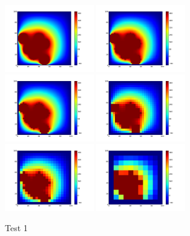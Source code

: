 \documentclass[a4paper]{article}
\begin{document}
\begin{figure}[htbp]
\includegraphics[width=110pt]{img/Parabrisas1-1.png} \includegraphics[width=110pt]{img/Parabrisas1-2.png} \includegraphics[width=110pt]{img/Parabrisas1-2,5.png} \newline \includegraphics[width=110pt]{img/Parabrisas1-4.png} \includegraphics[width=110pt]{img/Parabrisas1-5.png} \includegraphics[width=110pt]{img/Parabrisas1-10.png} \newline
\caption{Test 1}
\end{figure}
\end{document}
